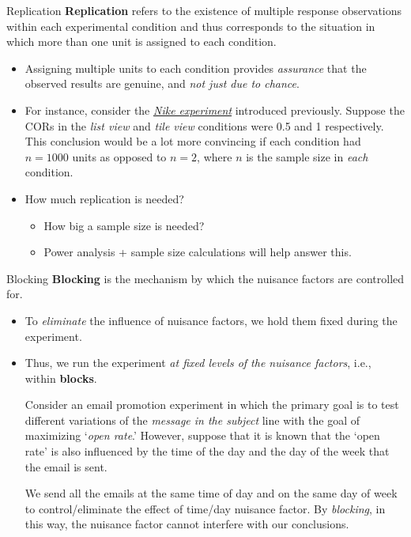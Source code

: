 \begin{Definition}{Replication}{}
    \textbf{Replication} refers to the existence of multiple response observations
    within each experimental condition and thus corresponds to the situation in which
    more than one unit is assigned to each condition.
\end{Definition}
\begin{itemize}
    \item Assigning multiple units to each condition provides \emph{assurance} that the
          observed results are genuine, and \emph{not just due to chance}.
    \item For instance, consider the \emph{\hyperref[ex:nike_ex]{Nike experiment}}
          introduced previously. Suppose the CORs in the \emph{list view} and
          \emph{tile view} conditions were 0.5 and 1 respectively. This conclusion would be
          a lot more convincing if each condition had $ n=1000 $ units as opposed to $ n=2 $,
          where $ n $ is the sample size in \emph{each} condition.
    \item How much replication is needed?
          \begin{itemize}
              \item How big a sample size is needed?
              \item Power analysis + sample size calculations will help answer this.
          \end{itemize}
\end{itemize}
\begin{Definition}{Blocking}{}
    \textbf{Blocking} is the mechanism by which the nuisance factors are controlled for.
\end{Definition}
\begin{itemize}
    \item To \emph{eliminate} the influence of nuisance factors, we hold them fixed during
          the experiment.
    \item Thus, we run the experiment \emph{at fixed levels of the nuisance factors}, i.e.,
          within \textbf{blocks}.

          \begin{Example}{}{}
              Consider an email promotion experiment in which the primary goal is to
              test different variations of the \emph{message in the subject} line with the goal of
              maximizing `\emph{open rate}.' However, suppose that it is known that the
              `open rate' is also influenced by the time of the day and the day of the week that
              the email is sent.

              \vspace{2mm}

              We send all the emails at the same time of day and on the same day of week
              to control/eliminate the effect of time/day nuisance factor. By \emph{blocking},
              in this way, the nuisance factor cannot interfere with our conclusions.
          \end{Example}
\end{itemize}
